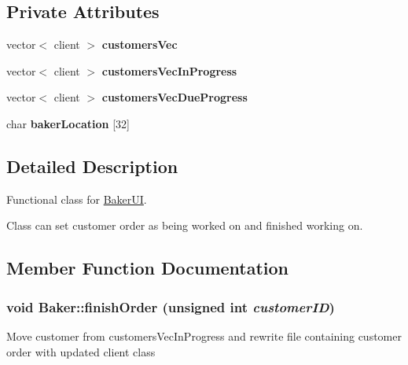 \subsection*{Private Attributes}
\begin{CompactItemize}
\item 
\hypertarget{class_baker_52cc86469dd41b9be5b7186d6bd00589}{
vector$<$ client $>$ {\bf customers\-Vec}}
\label{class_baker_52cc86469dd41b9be5b7186d6bd00589}

\item 
\hypertarget{class_baker_0b7dacb9817ff529ee046a5c369051fa}{
vector$<$ client $>$ {\bf customers\-Vec\-In\-Progress}}
\label{class_baker_0b7dacb9817ff529ee046a5c369051fa}

\item 
\hypertarget{class_baker_e9843b8d2c12d0911de538ebe51c1b0d}{
vector$<$ client $>$ {\bf customers\-Vec\-Due\-Progress}}
\label{class_baker_e9843b8d2c12d0911de538ebe51c1b0d}

\item 
\hypertarget{class_baker_c8a23bee3af95af3a6fa8e3f631e9a92}{
char {\bf baker\-Location} \mbox{[}32\mbox{]}}
\label{class_baker_c8a23bee3af95af3a6fa8e3f631e9a92}

\end{CompactItemize}


\subsection{Detailed Description}
Functional class for \hyperlink{class_baker_u_i}{Baker\-UI}. 

Class can set customer order as being worked on and finished working on. 



\subsection{Member Function Documentation}
\hypertarget{class_baker_222a16bf113b70cbe0388a7291978a57}{
\subsubsection[finishOrder]{\setlength{\rightskip}{0pt plus 5cm}void Baker::finish\-Order (unsigned int {\em customer\-ID})}}
\label{class_baker_222a16bf113b70cbe0388a7291978a57}


Move customer from customers\-Vec\-In\-Progress and rewrite file containing customer order with updated client class

